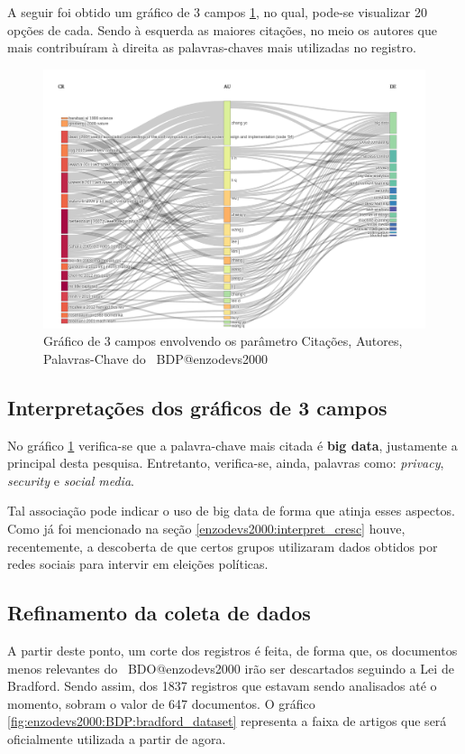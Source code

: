 A seguir foi obtido um gráfico de 3 campos \ref{fig:enzodevs2000:BDP:3plotRAK}, no qual, pode-se visualizar 20 opções de cada. Sendo à esquerda as maiores citações, no meio os autores que mais contribuíram à direita as palavras-chaves mais utilizadas no registro.

\begin{figure}[H]
    \centering
    \includegraphics[width=1\textwidth]{experiments/enzodevs2000/AnaliseBibliometrica/BigDataInPolicy/Figures/Graficos/references_authors_keywords.png}
    \caption{Gráfico de 3 campos envolvendo os parâmetro Citações, Autores, Palavras-Chave do \dataset\ BDP@enzodevs2000}
    \label{fig:enzodevs2000:BDP:3plotRAK}
\end{figure}

\subsection{Interpretações dos gráficos de 3 campos}

No gráfico \ref{fig:enzodevs2000:BDP:3plotRAK} verifica-se que a palavra-chave mais citada é \textbf{big data}, justamente a principal desta pesquisa. Entretanto, verifica-se, ainda, palavras como: \textit{privacy}, \textit{security} e \textit{social media}.

Tal associação pode indicar o uso de big data de forma que atinja esses aspectos. Como já foi mencionado na seção \ref{enzodevs2000:interpret_cresc} houve, recentemente, a descoberta de que certos grupos utilizaram dados obtidos por redes sociais para intervir em eleições políticas.

\subsection{Refinamento da coleta de dados}
A partir deste ponto, um corte dos registros é feita, de forma que, os documentos menos relevantes do \dataset\ BDO@enzodevs2000 irão ser descartados seguindo a Lei de Bradford. Sendo assim, dos 1837 registros que estavam sendo analisados até o momento, sobram o valor de 647 documentos. O gráfico \ref{fig:enzodevs2000:BDP:bradford_dataset} representa a faixa de artigos que será oficialmente utilizada a partir de agora.

